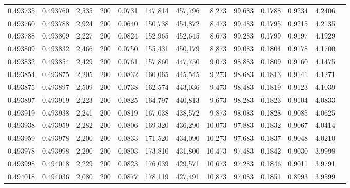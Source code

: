\begin{tabular}{rrrrrrrrrrrrr}
0.493735 & 0.493760 & 2,535 & 200 &                                     0.0731 & 147,814 & 457,796 &   8,273 &  99,683 & 0.1788 & 0.9234 & 4.2406 \\
0.493760 & 0.493788 & 2,924 & 200 &                                     0.0640 & 150,738 & 454,872 &   8,473 &  99,483 & 0.1795 & 0.9215 & 4.2135 \\
0.493788 & 0.493809 & 2,227 & 200 &                                     0.0824 & 152,965 & 452,645 &   8,673 &  99,283 & 0.1799 & 0.9197 & 4.1929 \\
0.493809 & 0.493832 & 2,466 & 200 &                                     0.0750 & 155,431 & 450,179 &   8,873 &  99,083 & 0.1804 & 0.9178 & 4.1700 \\
0.493832 & 0.493854 & 2,429 & 200 &                                     0.0761 & 157,860 & 447,750 &   9,073 &  98,883 & 0.1809 & 0.9160 & 4.1475 \\
0.493854 & 0.493875 & 2,205 & 200 &                                     0.0832 & 160,065 & 445,545 &   9,273 &  98,683 & 0.1813 & 0.9141 & 4.1271 \\
0.493875 & 0.493897 & 2,509 & 200 &                                     0.0738 & 162,574 & 443,036 &   9,473 &  98,483 & 0.1819 & 0.9123 & 4.1039 \\
0.493897 & 0.493919 & 2,223 & 200 &                                     0.0825 & 164,797 & 440,813 &   9,673 &  98,283 & 0.1823 & 0.9104 & 4.0833 \\
0.493919 & 0.493938 & 2,241 & 200 &                                     0.0819 & 167,038 & 438,572 &   9,873 &  98,083 & 0.1828 & 0.9085 & 4.0625 \\
0.493938 & 0.493959 & 2,282 & 200 &                                     0.0806 & 169,320 & 436,290 &  10,073 &  97,883 & 0.1832 & 0.9067 & 4.0414 \\
0.493959 & 0.493978 & 2,200 & 200 &                                     0.0833 & 171,520 & 434,090 &  10,273 &  97,683 & 0.1837 & 0.9048 & 4.0210 \\
0.493978 & 0.493998 & 2,290 & 200 &                                     0.0803 & 173,810 & 431,800 &  10,473 &  97,483 & 0.1842 & 0.9030 & 3.9998 \\
0.493998 & 0.494018 & 2,229 & 200 &                                     0.0823 & 176,039 & 429,571 &  10,673 &  97,283 & 0.1846 & 0.9011 & 3.9791 \\
0.494018 & 0.494036 & 2,080 & 200 &                                     0.0877 & 178,119 & 427,491 &  10,873 &  97,083 & 0.1851 & 0.8993 & 3.9599 \\

\end{tabular}
